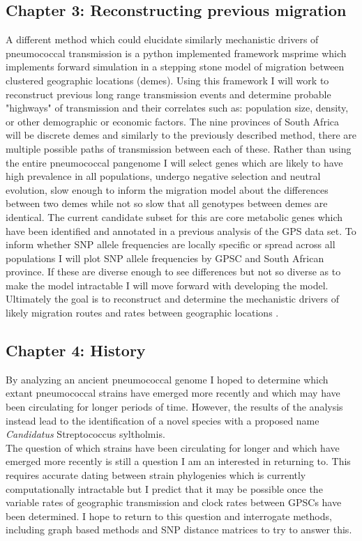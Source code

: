 \documentclass{article}
\begin{document}
\subsection{Chapter 3: Reconstructing previous migration}
A different method which could elucidate similarly mechanistic drivers of pneumococcal transmission is a python implemented framework msprime which implements forward simulation in a stepping stone model of migration between clustered geographic locations (demes). Using this framework I will work to reconstruct previous long range transmission events and determine probable "highways" of transmission and their correlates such as: population size, density, or other demographic or economic factors. The nine provinces of South Africa will be discrete demes and similarly to the previously described method, there are multiple possible paths of transmission between each of these. Rather than using the entire pneumococcal pangenome I will select genes which are likely to have high prevalence in all populations, undergo negative selection and neutral evolution, slow enough to inform the migration model about the differences between two demes while not so slow that all genotypes between demes are identical. The current candidate subset for this are core metabolic genes which have been identified and annotated in a previous analysis of the GPS data set. To inform whether SNP allele frequencies are locally specific or spread across all populations I will plot SNP allele frequencies by GPSC and South African province. If these are diverse enough to see differences but not so diverse as to make the model intractable I will move forward with developing the model. Ultimately the goal is to reconstruct and determine the mechanistic drivers of likely migration routes and rates between geographic locations \cite{kelleherEfficientCoalescentSimulation2016,gutenkunstInferringJointDemographic2009}. 
\subsection{Chapter 4: History}
By analyzing an ancient pneumococcal genome I hoped to determine which extant pneumococcal strains have emerged more recently and which may have been circulating for longer periods of time. However, the results of the analysis instead lead to the identification of a novel species with a proposed name \textit{Candidatus} Streptococcus syltholmis. \\The question of which strains have been circulating for longer and which have emerged more recently is still a question I am an interested in returning to. This requires accurate dating between strain phylogenies which is currently computationally intractable but I predict that it may be possible once the variable rates of geographic transmission and clock rates between GPSCs have been determined.  I hope to return to this question and interrogate methods, including graph based methods and SNP distance matrices to try to answer this.
\end{document}
